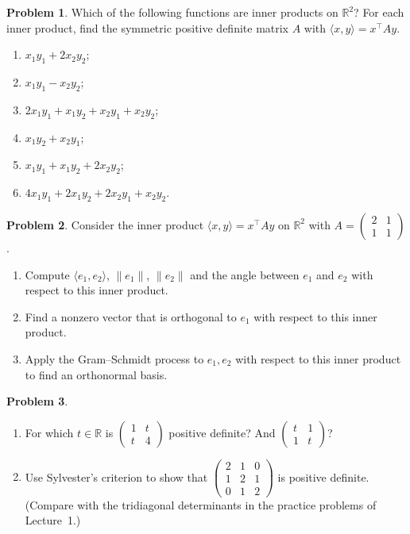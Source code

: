 \documentclass[11pt]{article}
\theoremstyle{definition}
\newtheorem{problem}{Problem}[section]
\newcommand{\norm}[1]{\lVert #1 \rVert}
\newcommand{\ip}[2]{\langle #1, #2 \rangle}
\begin{document}
\begin{problem}\label{pr:which-ip}
    Which of the following functions are inner products on $\mathbb{R}^2$? For each inner product, find the symmetric positive definite matrix $A$ with $\ip{x}{y} = x^\top A y$.
    \begin{enumerate}[label=(\alph*)]
        \item $x_1 y_1 + 2 x_2 y_2$;
        \item $x_1 y_1 - x_2 y_2$;
        \item $2x_1 y_1 + x_1 y_2 + x_2 y_1 + x_2 y_2$;
        \item $x_1 y_2 + x_2 y_1$;
        \item $x_1 y_1 + x_1 y_2 + 2x_2 y_2$;
        \item $4x_1 y_1 + 2x_1 y_2 + 2x_2 y_1 + x_2 y_2$.
    \end{enumerate}
\end{problem}

\begin{problem}\label{pr:ip-gram}
    Consider the inner product $\ip{x}{y} = x^\top A y$ on $\mathbb{R}^2$ with $A = \begin{pmatrix} 2 & 1 \\ 1 & 1 \end{pmatrix}$.
    \begin{enumerate}[label=(\alph*)]
        \item Compute $\ip{e_1}{e_2}$, $\norm{e_1}$, $\norm{e_2}$ and the angle between $e_1$ and $e_2$ with respect to this inner product.
        \item Find a nonzero vector that is orthogonal to $e_1$ with respect to this inner product.
        \item Apply the Gram--Schmidt process to $e_1, e_2$ with respect to this inner product to find an orthonormal basis.
    \end{enumerate}
\end{problem}

\begin{problem}\label{pr:spd-param}
    \begin{enumerate}[label=(\alph*)]
        \item For which $t \in \mathbb{R}$ is $\begin{pmatrix} 1 & t \\ t & 4 \end{pmatrix}$ positive definite? And $\begin{pmatrix} t & 1 \\ 1 & t \end{pmatrix}$?
        \item Use Sylvester's criterion to show that $\begin{pmatrix} 2 & 1 & 0 \\ 1 & 2 & 1 \\ 0 & 1 & 2 \end{pmatrix}$ is positive definite. (Compare with the tridiagonal determinants in the practice problems of Lecture~1.)
    \end{enumerate}
\end{problem}
\end{document}
